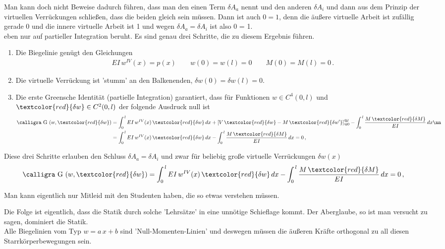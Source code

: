 {Man kann doch nicht Beweise dadurch f\"{u}hren, dass man den einen Term $\delta A_a$ nennt und den anderen $\delta A_i$ und dann aus dem Prinzip der virtuellen Verr\"{u}ckungen schlie{\ss}en, dass die beiden gleich sein m\"{u}ssen. Dann ist auch $0 = 1$, denn die \"{a}u{\ss}ere virtuelle Arbeit ist zuf\"{a}llig gerade 0 und die innere virtuelle Arbeit ist 1 und wegen $\delta A_a = \delta A_i$ ist also 0 = 1.\\

 eben nur auf partieller Integration beruht. Es sind genau drei Schritte, die zu diesem Ergebnis f\"{u}hren.
\begin{enumerate}
  \item Die Biegelinie gen\"{u}gt den Gleichungen
\begin{align}
EI\,w^{IV}(x) = p(x) \qquad w(0) = w(l) = 0 \qquad M(0) = M(l) = 0\,.
\end{align}
  \item Die virtuelle Verr\"{u}ckung ist 'stumm' an den Balkenenden, $\delta w(0) = \delta w(l) = 0$.
  \item Die erste Greensche Identit\"{a}t (partielle Integration) garantiert, dass f\"{u}r Funktionen $w \in C^4(0,l)$  und $\textcolor{red}{\delta w } \in C^2(0,l)$ der folgende Ausdruck null ist
\begin{align}
\text{\normalfont\calligra G\,\,}(w,\textcolor{red}{\delta w }) &= \int_0^{\,l} EI\,w^{IV}(x)\,\textcolor{red}{\delta w }\,dx + [V\,\textcolor{red}{\delta w } - M\,\textcolor{red}{\delta w '}]_{@0}^{@l} - \int_0^{\,l} \frac{M\,\textcolor{red}{\delta M}}{EI}\,dx \nn\\
&=  \int_0^{\,l} EI\,w^{IV}(x)\,\textcolor{red}{\delta w }\,dx - \int_0^{\,l} \frac{M\,\textcolor{red}{\delta M}}{EI}\,dx = 0\,,
\end{align}
\end{enumerate}
Diese drei Schritte erlauben den Schluss $\delta A_a = \delta A_i$ und zwar f\"{u}r beliebig gro{\ss}e virtuelle Verr\"{u}ckungen $\delta w(x)$
\begin{align}
\text{\normalfont\calligra G\,\,}(w,\textcolor{red}{\delta w }) &= \int_0^{\,l} EI\,w^{IV}(x)\,\textcolor{red}{\delta w }\,dx - \int_0^{\,l} \frac{M\,\textcolor{red}{\delta M}}{EI}\,dx = 0\,,
\end{align}

Man kann eigentlich nur Mitleid mit den Studenten haben, die so etwas verstehen m\"{u}ssen.

Die Folge ist eigentlich, dass die Statik durch solche 'Lehrs\"{a}tze' in eine unn\"{o}tige Schieflage kommt. Der Aberglaube, so ist man versucht zu sagen, dominiert die Statik.\\
Alle Biegelinien vom Typ $w = a\,x + b$ sind 'Null-Momenten-Linien' und deswegen m\"{u}ssen die \"{a}u{\ss}eren Kr\"{a}fte orthogonal zu all diesen Starrk\"{o}rperbewegungen sein.
\\

}
